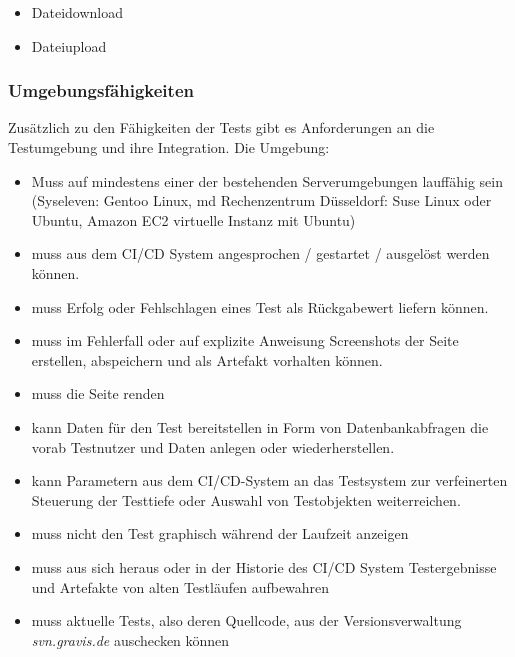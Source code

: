 \begin{itemize}
\itemsep1pt\parskip0pt
\item
  Dateidownload
\item
  Dateiupload
\end{itemize}

\subsubsection{Umgebungsfähigkeiten}\label{umgebungsfuxe4higkeiten}

Zusätzlich zu den Fähigkeiten der Tests gibt es Anforderungen an die
Testumgebung und ihre Integration. Die Umgebung:

\begin{itemize}
\itemsep1pt\parskip0pt
\item
  Muss auf mindestens einer der bestehenden Serverumgebungen lauffähig
  sein (Syseleven: Gentoo Linux, md Rechenzentrum Düsseldorf: Suse Linux
  oder Ubuntu, Amazon EC2 virtuelle Instanz mit Ubuntu)
\item
  muss aus dem CI/CD System angesprochen / gestartet / ausgelöst werden
  können.
\item
  muss Erfolg oder Fehlschlagen eines Test als Rückgabewert liefern
  können.
\item
  muss im Fehlerfall oder auf explizite Anweisung Screenshots der Seite
  erstellen, abspeichern und als Artefakt vorhalten können.
\item
  muss die Seite renden
\item
  kann Daten für den Test bereitstellen in Form von Datenbankabfragen
  die vorab Testnutzer und Daten anlegen oder wiederherstellen.
\item
  kann Parametern aus dem CI/CD-System an das Testsystem zur
  verfeinerten Steuerung der Testtiefe oder Auswahl von Testobjekten
  weiterreichen.
\item
  muss nicht den Test graphisch während der Laufzeit anzeigen
\item
  muss aus sich heraus oder in der Historie des CI/CD System
  Testergebnisse und Artefakte von alten Testläufen aufbewahren
\item
  muss aktuelle Tests, also deren Quellcode, aus der Versionsverwaltung
  \emph{svn.gravis.de} auschecken können
\end{itemize}
